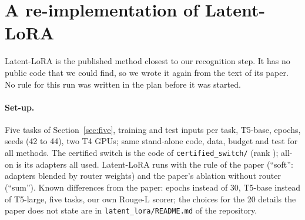 \begin{table}[h]
  \caption{The test on \ManyTasks{} tasks for six orders of arrival, after all tasks.}
  \label{tab:manyorders}
  \centering
  \footnotesize
  \setlength{\tabcolsep}{2.5pt}
  
\end{table}

\begin{table}[h]
  \caption{Other radius factors on the \ManyTasks{} tasks (main order). Added after the run; \cert{} uses $\kappa = 0.5$.}
  \label{tab:manykappa}
  \centering
  \small
  \setlength{\tabcolsep}{4pt}
  
\end{table}

\begin{table}[h]
  \caption{Examples of collisions (main order). Above the line: the six colliding tasks whose
  definition is least like that of the task they collide with. Below: two members of the
  largest family and two tasks with the same definition text as an older task. ``Common words'':
  words shared by the two definitions, as a share of the longer one.}
  \label{tab:manyexamples}
  \centering
  \scriptsize
  \setlength{\tabcolsep}{3pt}
  
\end{table}

\FloatBarrier
\section{A re-implementation of Latent-LoRA}
\label{app:latent}

Latent-LoRA \citep{latentlora2026} is the published method closest to our recognition step. It has no public code that we could find, so we wrote it again from the text of its paper. No rule for this run was written in the plan before it was started.

\paragraph{Set-up.} Five tasks of Section~\ref{sec:five}, \LatentTrainInputs{} training and \LatentTestInputs{} test inputs per task, T5-base, \LatentEpochs{} epochs, \LatentSeeds{} seeds (42 to 44), two T4 GPUs; same stand-alone code, data, budget and test for all methods. The certified switch is the code of \texttt{certified\_switch/} (rank \LatentRank{}); all-on is its adapters all used. Latent-LoRA runs with the rule of the paper (``soft'': adapters blended by router weights) and the paper's ablation without router (``sum''). Known differences from the paper: \LatentEpochs{} epochs instead of 30, T5-base instead of T5-large, five tasks, our own Rouge-L scorer; the choices for the 20 details the paper does not state are in \texttt{latent\_lora/README.md} of the repository.

